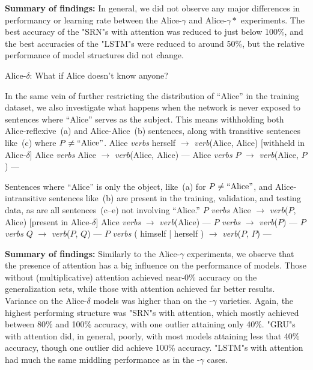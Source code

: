 {\bf Summary of findings:} In general, we did not observe any major differences
in performancy or learning rate between the Alice-$\gamma$ and Alice-$\gamma*$
experiments. The best accuracy of the "SRN"s with attention was reduced to just below 100\%, and the best accuracies of the "LSTM"s were reduced to around
50\%, but the relative performance of model structures did not change.


\ssec Alice-$\delta$: What if Alice doesn't know anyone?

In the same vein of further restricting the distribution of ``Alice'' in the
training dataset, we also investigate what happens when the network is never
exposed to sentences where ``Alice'' serves as the subject. This means 
withholding both Alice-reflexive~(\nextx a) and Alice-Alice~(\nextx b)
sentences, along with transitive sentences like~(\nextx c) where 
$P \not= \hbox{``Alice''}$.
\pex
	\a Alice {\em verbs} herself $\to$ {\em verb}(Alice, Alice) \hfill [withheld in Alice-$\delta$]
	\a Alice {\em verbs} Alice $\to$ {\em verb}(Alice, Alice) \hfill ---
	\a Alice {\em verbs} $P$ $\to$ {\em verb}(Alice, $P$) \hfill ---
\xe


Sentences where ``Alice'' is only the object, like~(\nextx a) for 
$P \not= \hbox{``Alice''}$, and Alice-intransitive sentences like~(\nextx b) are present in the training, validation, and 
testing data, as are all sentences~(\nextx c--e) not involving ``Alice.''
\pex
	\a $P$ {\em verbs} Alice $\to$ {\em verb}($P$, Alice) \hfill [present in Alice-$\delta$]
	\a Alice {\em verbs} $\to$ {\em verb}(Alice) \hfill ---
	\a $P$ {\em verbs} $\to$ {\em verb}($P$) \hfill ---
	\a $P$ {\em verbs} $Q$ $\to$ {\em verb}($P$, $Q$) \hfill ---
	\a $P$ {\em verbs} ( himself | herself ) $\to$ {\em verb}($P$, $P$) \hfill ---
\xe

{\bf Summary of findings:} Similarly to the Alice-$\gamma$ experiments, we 
observe that the presence of attention has a big influence on the performance
of models. Those without (multiplicative) attention achieved near-0\% accuracy
on the generalization sets, while those with attention achieved far better
results. Variance on the Alice-$\delta$ models was higher than on the -$\gamma$
varieties. Again, the highest performing structure was "SRN"s with attention,
which mostly achieved between 80\% and 100\% accuracy, with one outlier 
attaining only 40\%. "GRU"s with attention did, in general, poorly, with most
models attaining less that 40\% accuracy, though one outlier did achieve 100\%
accuracy. "LSTM"s with attention had much the same middling performance as in
the -$\gamma$ cases.

